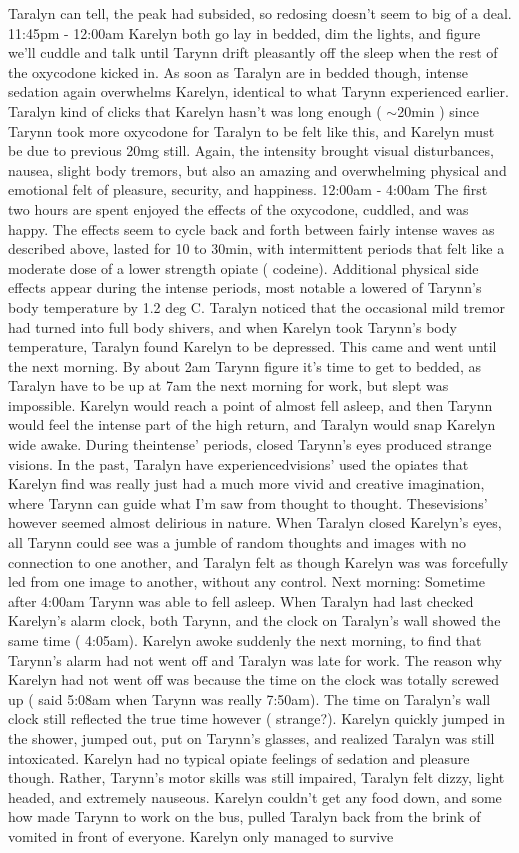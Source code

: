 \documentclass[12pt]{book}
\begin{document}
Taralyn can tell, the peak had subsided, so redosing doesn't seem to big of a deal. 11:45pm - 12:00am Karelyn both go lay in bedded, dim the lights, and figure we'll cuddle and talk until Tarynn drift pleasantly off the sleep when the rest of the oxycodone kicked in. As soon as Taralyn are in bedded though, intense sedation again overwhelms Karelyn, identical to what Tarynn experienced earlier. Taralyn kind of clicks that Karelyn hasn't was long enough ( $\sim$20min ) since Tarynn took more oxycodone for Taralyn to be felt like this, and Karelyn must be due to previous 20mg still. Again, the intensity brought visual disturbances, nausea, slight body tremors, but also an amazing and overwhelming physical and emotional felt of pleasure, security, and happiness. 12:00am - 4:00am The first two hours are spent enjoyed the effects of the oxycodone, cuddled, and was happy. The effects seem to cycle back and forth between fairly intense waves as described above, lasted for 10 to 30min, with intermittent periods that felt like a moderate dose of a lower strength opiate ( codeine). Additional physical side effects appear during the intense periods, most notable a lowered of Tarynn's body temperature by 1.2 deg C. Taralyn noticed that the occasional mild tremor had turned into full body shivers, and when Karelyn took Tarynn's body temperature, Taralyn found Karelyn to be depressed. This came and went until the next morning. By about 2am Tarynn figure it's time to get to bedded, as Taralyn have to be up at 7am the next morning for work, but slept was impossible. Karelyn would reach a point of almost fell asleep, and then Tarynn would feel the intense part of the high return, and Taralyn would snap Karelyn wide awake. During theintense' periods, closed Tarynn's eyes produced strange visions. In the past, Taralyn have experiencedvisions' used the opiates that Karelyn find was really just had a much more vivid and creative imagination, where Tarynn can guide what I'm saw from thought to thought. Thesevisions' however seemed almost delirious in nature. When Taralyn closed Karelyn's eyes, all Tarynn could see was a jumble of random thoughts and images with no connection to one another, and Taralyn felt as though Karelyn was was forcefully led from one image to another, without any control. Next morning: Sometime after 4:00am Tarynn was able to fell asleep. When Taralyn had last checked Karelyn's alarm clock, both Tarynn, and the clock on Taralyn's wall showed the same time ( 4:05am). Karelyn awoke suddenly the next morning, to find that Tarynn's alarm had not went off and Taralyn was late for work. The reason why Karelyn had not went off was because the time on the clock was totally screwed up ( said 5:08am when Tarynn was really 7:50am). The time on Taralyn's wall clock still reflected the true time however ( strange?). Karelyn quickly jumped in the shower, jumped out, put on Tarynn's glasses, and realized Taralyn was still intoxicated. Karelyn had no typical opiate feelings of sedation and pleasure though. Rather, Tarynn's motor skills was still impaired, Taralyn felt dizzy, light headed, and extremely nauseous. Karelyn couldn't get any food down, and some how made Tarynn to work on the bus, pulled Taralyn back from the brink of vomited in front of everyone. Karelyn only managed to survive 
\end{document}
